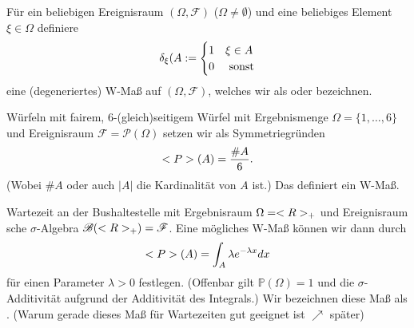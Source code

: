 \begin{example}
	Für ein beliebigen Ereignisraum $(\Omega, \mathscr{F})$ ($\Omega \neq \emptyset$) und eine beliebiges Element $\xi \in \Omega$ definiere
	\begin{align}
		\delta_{\xi}(A := \begin{cases}
		1 & \xi \in A \\
		0 & \text{ sonst}
		\end{cases}\notag
	\end{align}
	eine (degeneriertes) W-Maß auf $(\Omega, \mathscr{F})$, welches wir als  oder  bezeichnen.
\end{example}

\begin{example}
	Würfeln mit fairem, $6$-(gleich)seitigem Würfel mit Ergebnismenge $\Omega=\{1, \dots, 6\}$ und Ereignisraum $\mathscr{F} = \mathscr{P}(\Omega)$ setzen wir als Symmetriegründen
	\begin{align}
		\mathbb{P}(A) = \frac{\# A}{6}.\notag
	\end{align}
	(Wobei $\# A$ oder auch $\vert A \vert$ die Kardinalität von $A$ ist.) Das definiert ein W-Maß.
\end{example}

\begin{example}
	Wartezeit an der Bushaltestelle mit Ergebnisraum $\Omega = \real_{+}$ und Ereignisraum sche $\sigma$-Algebra $\mathscr{B}(\real_{+}) = \mathscr{F}$. Eine mögliches W-Maß können wir dann durch
	\begin{align}
	\mathbb{P}(A) = \int_{A} \lambda e^{-\lambda x} dx\notag %
	\end{align}
	für einen Parameter $\lambda > 0$ festlegen. (Offenbar gilt $\mathbb{P}(\Omega) = 1$ und die $\sigma$-Additivität aufgrund der Additivität des Integrals.) Wir bezeichnen diese Maß als . (Warum gerade dieses Maß für Wartezeiten gut geeignet ist $\nearrow$ später) %
\end{example} 
